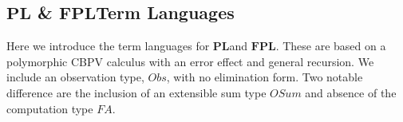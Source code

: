 \documentclass[acmsmall]{acmart}
\newcommand{\eric}[1]{\textcolor{red}{ <eric-#1> }}
\newcommand{\pl}{$\mathbf{PL}$}
\newcommand{\fpl}{$\mathbf{FPL}$}
\begin{document}
\subsection{\pl \; \& \fpl \;Term Languages}\label{sec:ObjLang}


Here we introduce the term languages for \pl \;and \fpl. These are based on a polymorphic CBPV calculus with an error effect and general recursion. We include an observation type, $Obs$, with no elimination form. Two notable difference are the inclusion of an extensible sum type $OSum$ and absence of the computation type $FA$.
\end{document}
